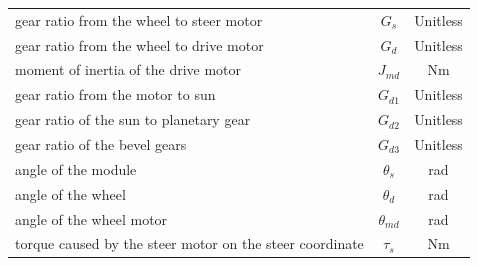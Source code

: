 \documentclass{article}
\begin{document}
\begin{center}
\begin{tabular}{l c c}
        gear ratio from the wheel to steer motor                                  & $G_s$         & Unitless               \\
        gear ratio from the wheel to drive motor                                  & $G_d$         & Unitless               \\
        moment of inertia of the drive motor                                      & $J_{md}$      & Nm                     \\
        gear ratio from the motor to sun                                          & $G_{d1}$      & Unitless               \\
        gear ratio of the sun to planetary gear                                   & $G_{d2}$      & Unitless               \\
        gear ratio of the bevel gears                                             & $G_{d3}$      & Unitless               \\
        angle of the module                                                       & $\theta_s$    & rad                    \\
        angle of the wheel                                                        & $\theta_d$    & rad                    \\
        angle of the wheel motor                                                  & $\theta_{md}$ & rad                    \\
        torque caused by the steer motor on the steer coordinate                  & $\tau_s$      & Nm                     \\
        \bottomrule
    \end{tabular}
\end{center}
\end{document}
